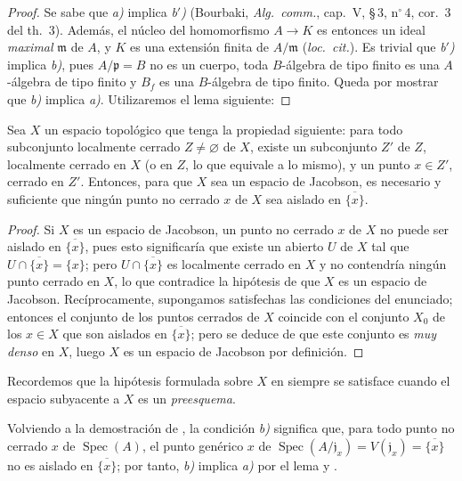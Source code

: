 \begin{proof}
Se sabe que \emph{a)} implica \emph{b$'$)} (Bourbaki, \emph{Alg.\ comm.}, cap.~V, \S\,3, n$^\circ$\,4, cor.~3 del th.~3).
Además, el núcleo del homomorfismo $A\to K$ es entonces un ideal \emph{maximal} $\mathfrak m$ de $A$, y $K$ es una extensión finita de $A/\mathfrak m$ (\emph{loc.\ cit.}).
Es trivial que \emph{b$'$)} implica \emph{b)}, pues $A/\mathfrak p=B$ no es un cuerpo, toda $B$-álgebra de tipo finito es una $A$-álgebra de tipo finito y $B_f$ es una $B$-álgebra de tipo finito.
Queda por mostrar que \emph{b)} implica \emph{a)}.
Utilizaremos el lema siguiente:
\end{proof}

\begin{lemma}[10.4.5.1]
\label{IV.10.4.5.1}
Sea $X$ un espacio topológico que tenga la propiedad siguiente: para todo subconjunto localmente cerrado $Z\neq\varnothing$ de $X$, existe un subconjunto $Z'$ de $Z$, localmente cerrado en $X$ (o en $Z$, lo que equivale a lo mismo), y un punto $x\in Z'$, cerrado en $Z'$.
Entonces, para que $X$ sea un espacio de Jacobson, es necesario y suficiente que ningún punto no cerrado $x$ de $X$ sea aislado en $\overline{\{x\}}$.
\end{lemma}

\begin{proof}
Si $X$ es un espacio de Jacobson, un punto no cerrado $x$ de $X$ no puede ser aislado en $\overline{\{x\}}$, pues esto significaría que existe un abierto $U$ de $X$ tal que $U\cap\overline{\{x\}}=\{x\}$; pero $U\cap\overline{\{x\}}$ es localmente cerrado en $X$ y no contendría ningún punto cerrado en $X$, lo que contradice la hipótesis de que $X$ es un espacio de Jacobson.
Recíprocamente, supongamos satisfechas las condiciones del enunciado; entonces el conjunto de los puntos cerrados de $X$ coincide con el conjunto $X_0$ de los $x\in X$ que son aislados en $\overline{\{x\}}$; pero se deduce de  que
este conjunto es \emph{muy denso} en $X$, luego $X$ es un espacio de Jacobson por definición.
\end{proof}

Recordemos  que la hipótesis formulada sobre $X$ en  siempre se satisface cuando el espacio subyacente a $X$ es un \emph{preesquema}.

Volviendo a la demostración de , la condición \emph{b)} significa que, para todo punto no cerrado $x$ de $\operatorname{Spec}(A)$, el punto genérico $x$ de $\operatorname{Spec}(A/\mathfrak j_x)=V(\mathfrak j_x)=\overline{\{x\}}$ no es aislado en $\overline{\{x\}}$; por tanto, \emph{b)} implica \emph{a)} por el lema  y .

